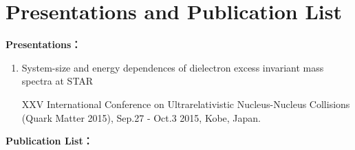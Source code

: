 ﻿
\chapter{Presentations and Publication List}

\noindent\textbf{Presentations：}

\begin{enumerate}

\item System-size and energy dependences of dielectron excess invariant mass spectra at STAR

XXV International Conference on Ultrarelativistic Nucleus-Nucleus Collisions (Quark Matter 2015), Sep.27 - Oct.3 2015, Kobe, Japan.

\end{enumerate}


\noindent\textbf{Publication List：}

